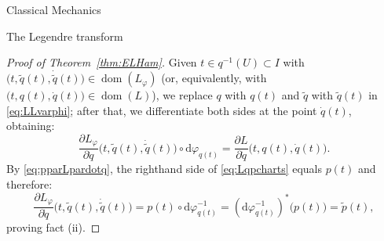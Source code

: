 \documentclass[oneside,a4paper,11pt]{amsbook}
\newcommand{\dd}{\mathrm d}
\DeclareMathOperator{\Dom}{dom}
\theoremstyle{remark}\newtheorem{exercise}{Exercise}[chapter]
\theoremstyle{plain}\newtheorem{teo}{Theorem}[section]
\theoremstyle{plain}\newtheorem{lem}[teo]{Lemma}
\theoremstyle{plain}\newtheorem{prop}[teo]{Proposition}
\theoremstyle{plain}\newtheorem{cor}[teo]{Corollary}
\theoremstyle{definition}\newtheorem{defin}[teo]{Definition}
\theoremstyle{remark}\newtheorem{rem}[teo]{Remark}
\theoremstyle{definition}\newtheorem{notation}[teo]{Notation}
\theoremstyle{definition}\newtheorem{convention}[teo]{Convention}
\theoremstyle{definition}\newtheorem{example}[teo]{Example}
\numberwithin{section}{chapter}
\numberwithin{equation}{section}
\begin{document}
\begin{chapter}{Classical Mechanics}
\begin{section}{The Legendre transform}
\begin{proof}[Proof of Theorem~\ref{thm:ELHam}]
Given $t\in q^{-1}(U)\subset I$ with $\big(t,\tilde q(t),\dot{\tilde q}(t)\big)\in\Dom(L_\varphi)$ (or, equivalently,
with $\big(t,q(t),\dot q(t)\big)\in\Dom(L)$), we replace $q$ with $q(t)$ and $\tilde q$ with $\tilde q(t)$
in \eqref{eq:LLvarphi}; after that, we differentiate both sides at the point $\dot q(t)$, obtaining:
\begin{equation}\label{eq:Lqpcharts}
\frac{\partial L_\varphi}{\partial\dot q}\big(t,\tilde q(t),\dot{\tilde q}(t)\big)\circ\dd\varphi_{q(t)}=\frac{\partial L}{\partial\dot q}\big(t,q(t),\dot q(t)\big).
\end{equation}
By \eqref{eq:pparLpardotq}, the righthand side of \eqref{eq:Lqpcharts} equals $p(t)$ and therefore:
\[\frac{\partial L_\varphi}{\partial\dot q}\big(t,\tilde q(t),\dot{\tilde q}(t)\big)=p(t)\circ\dd\varphi_{q(t)}^{-1}
=(\dd\varphi_{q(t)}^{-1})^*\big(p(t)\big)=\tilde p(t),\]
proving fact (ii).
\end{proof}


\end{section}
\end{chapter}
\end{document}
